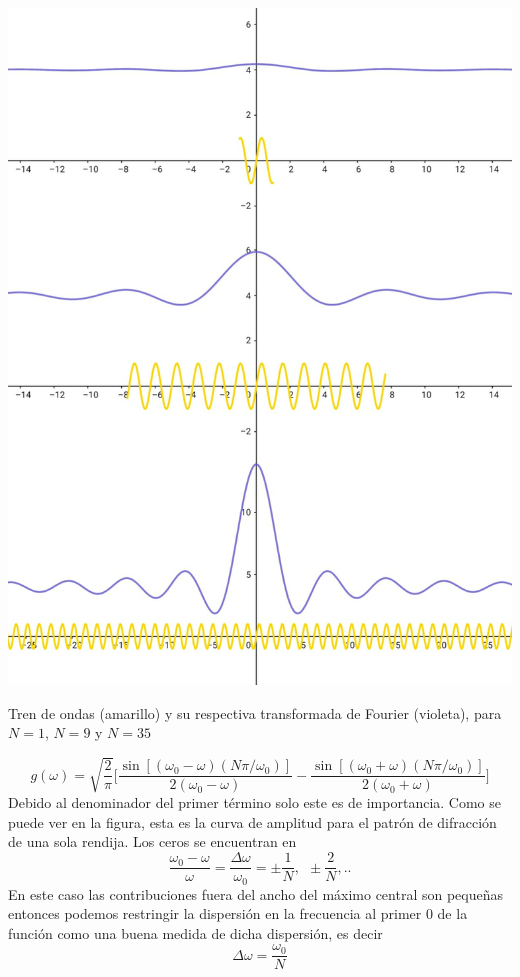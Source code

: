 \begin{marginfigure}
\captionsetup{type=figure}
    \centering
    \includegraphics[width=1.3\textwidth]{Im/senoss.jpg}
    \caption{Tren de ondas (amarillo) y su respectiva transformada de Fourier (violeta), para $N=1$, $N=9$ y $N=35$}
    \label{fig:sen}
\end{marginfigure}

\begin{equation}
     g(\omega) = \sqrt{\frac{2}{\pi}}\biggr[ \frac{\sin{[(\omega_0- \omega)(N\pi/\omega_0)]}}{2(\omega_0- \omega)}-\frac{\sin{[(\omega_0+ \omega)(N\pi/\omega_0)]}}{2(\omega_0+\omega)}\biggr]
\end{equation}
Debido al denominador del primer término solo este es de importancia. Como se puede ver en la figura, esta es la curva de amplitud para el patrón de difracción de una sola rendija. Los ceros se encuentran en 
\begin{equation}
    \frac{\omega_0 - \omega}{\omega} =\frac{\Delta \omega}{\omega_0} = \pm \frac{1}{N}, ~~\pm \frac{2}{N}, ..
\end{equation}
En este caso las contribuciones fuera del ancho del máximo central son pequeñas entonces podemos restringir la dispersión en la frecuencia al primer 0 de la función como una buena medida de dicha dispersión, es decir
\begin{equation}
    \Delta \omega = \frac{\omega_0}{N}
\end{equation}

